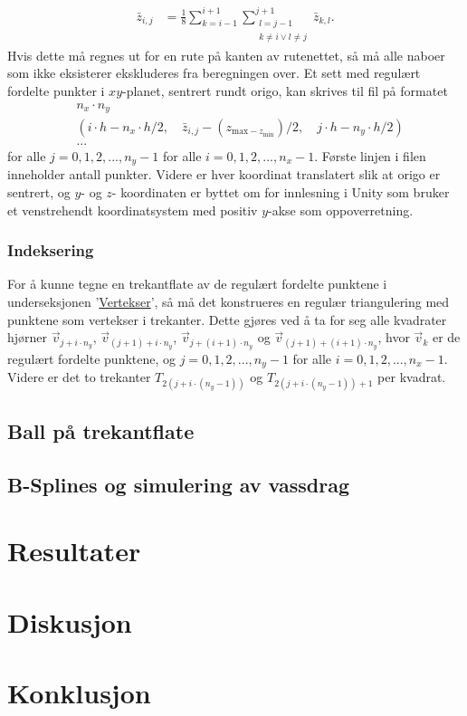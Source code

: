 \documentclass[norsk, doc, 12pt, a4paper]{apa7}  %
\begin{document}
\begin{align*}
	\bar{z}_{i,j} &= \frac{1}{8}\sum_{k=i-1}^{i+1}\sum_{\substack{l=j-1 \\ k\neq i \lor l\neq j}}^{j+1} \bar{z}_{k,l}.
\end{align*}
Hvis dette må regnes ut for en rute på kanten av rutenettet, så må alle naboer som ikke eksisterer ekskluderes fra beregningen over.
Et sett med regulært fordelte punkter i \(xy\)-planet, sentrert rundt origo, kan skrives til fil på formatet
\begin{align*}
	&n_{x}\cdot n_{y} \\
	&(i\cdot h - n_{x}\cdot h/2,\quad \bar{z}_{i,j} - (z_{\text{max} - z_{\text{min}}})/2,\quad j\cdot h - n_{y}\cdot h/2) \\
	&...
\end{align*}
for alle \(j=0,1,2,...,n_{y}-1\) for alle \(i=0,1,2,...,n_{x}-1\). Første linjen i filen inneholder antall punkter. Videre er hver koordinat translatert slik at origo er sentrert, og \(y\)- og \(z\)- koordinaten er byttet om for innlesning i Unity \parencite{UnityEngine2023} som bruker et venstrehendt koordinatsystem med positiv \(y\)-akse som oppoverretning.

\subsubsection{Indeksering}
For å kunne tegne en trekantflate av de regulært fordelte punktene i underseksjonen '\hyperref[M:1:1]{Vertekser}', så må det konstrueres en regulær triangulering med punktene som vertekser i trekanter. Dette gjøres ved å ta for seg alle kvadrater hjørner \(\vec{v}_{j + i\cdot n_{y}}\), \(\vec{v}_{(j+1) + i\cdot n_{y}}\), \(\vec{v}_{j + (i+1)\cdot n_{y}}\) og \(\vec{v}_{(j+1) + (i+1)\cdot n_{y}}\), hvor \(\vec{v}_{k}\) er de regulært fordelte punktene, og \(j=0,1,2,...,n_{y}-1\) for alle \(i=0,1,2,...,n_{x}-1\). Videre er det to trekanter \(T_{2(j + i\cdot (n_{y}-1))}\) og \(T_{2(j + i\cdot (n_{y}-1)) + 1}\) per kvadrat.



\subsection{Ball på trekantflate}
\subsection{B-Splines og simulering av vassdrag}
\parencite[s.7]{alexanderMovingBouldersFlash2016}
\section{Resultater}
\section{Diskusjon}
\section{Konklusjon}

\printbibliography
\end{document}
